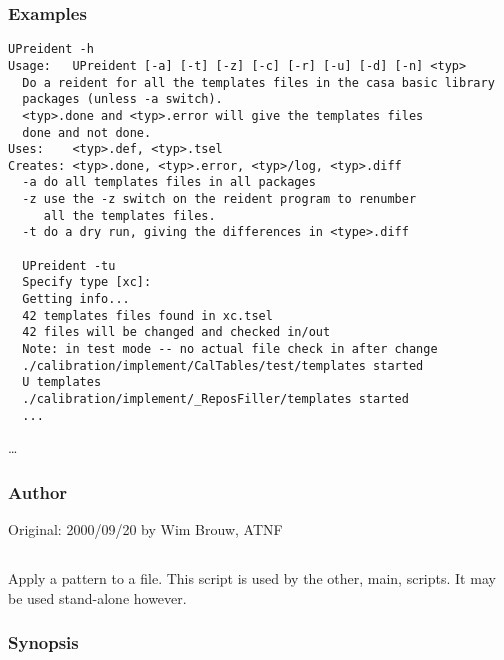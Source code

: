 \subsubsection*{Examples}

\begin{verbatim}
UPreident -h
Usage:   UPreident [-a] [-t] [-z] [-c] [-r] [-u] [-d] [-n] <typ>
  Do a reident for all the templates files in the casa basic library
  packages (unless -a switch).
  <typ>.done and <typ>.error will give the templates files
  done and not done.
Uses:    <typ>.def, <typ>.tsel
Creates: <typ>.done, <typ>.error, <typ>/log, <typ>.diff
  -a do all templates files in all packages
  -z use the -z switch on the reident program to renumber 
     all the templates files.
  -t do a dry run, giving the differences in <type>.diff

  UPreident -tu
  Specify type [xc]: 
  Getting info...
  42 templates files found in xc.tsel
  42 files will be changed and checked in/out
  Note: in test mode -- no actual file check in after change
  ./calibration/implement/CalTables/test/templates started
  U templates
  ./calibration/implement/_ReposFiller/templates started
  ...
\end{verbatim}
\ldots

\subsubsection*{Author}

Original: 2000/09/20 by Wim Brouw, ATNF


\newpage

\subsection{}
\label{UPsed}

Apply a  pattern to a file. This script is used  by the other, main,
 scripts. It may be used stand-alone however.

\subsubsection*{Synopsis}

\begin{synopsis}
\end{synopsis}

